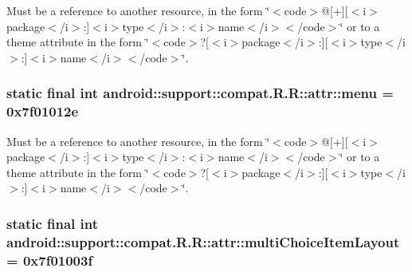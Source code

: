 Must be a reference to another resource, in the form \char`\"{}$<$code$>$@\mbox{[}+\mbox{]}\mbox{[}$<$i$>$package$<$/i$>$:\mbox{]}$<$i$>$type$<$/i$>$:$<$i$>$name$<$/i$>$$<$/code$>$\char`\"{} or to a theme attribute in the form \char`\"{}$<$code$>$?\mbox{[}$<$i$>$package$<$/i$>$:\mbox{]}\mbox{[}$<$i$>$type$<$/i$>$:\mbox{]}$<$i$>$name$<$/i$>$$<$/code$>$\char`\"{}. \hypertarget{classandroid_1_1support_1_1compat_1_1_r_1_1attr_82b0482416b2c67fe9d267f0cb666ee1}{
\subsubsection[{menu}]{\setlength{\rightskip}{0pt plus 5cm}static final int android::support::compat.R.R::attr::menu = 0x7f01012e}}
\label{classandroid_1_1support_1_1compat_1_1_r_1_1attr_82b0482416b2c67fe9d267f0cb666ee1}


Must be a reference to another resource, in the form \char`\"{}$<$code$>$@\mbox{[}+\mbox{]}\mbox{[}$<$i$>$package$<$/i$>$:\mbox{]}$<$i$>$type$<$/i$>$:$<$i$>$name$<$/i$>$$<$/code$>$\char`\"{} or to a theme attribute in the form \char`\"{}$<$code$>$?\mbox{[}$<$i$>$package$<$/i$>$:\mbox{]}\mbox{[}$<$i$>$type$<$/i$>$:\mbox{]}$<$i$>$name$<$/i$>$$<$/code$>$\char`\"{}. \hypertarget{classandroid_1_1support_1_1compat_1_1_r_1_1attr_951c1e7a1a4ba446941093c5965c9763}{
\subsubsection[{multiChoiceItemLayout}]{\setlength{\rightskip}{0pt plus 5cm}static final int android::support::compat.R.R::attr::multiChoiceItemLayout = 0x7f01003f}}
\label{classandroid_1_1support_1_1compat_1_1_r_1_1attr_951c1e7a1a4ba446941093c5965c9763}


